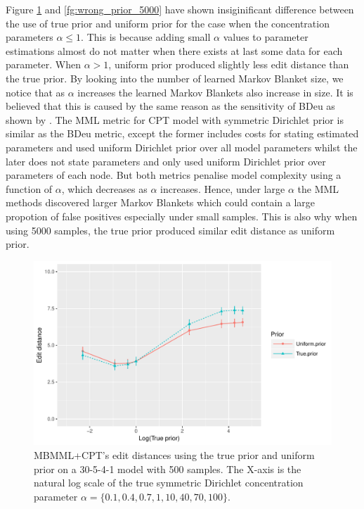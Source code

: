 \documentclass{svmult}
\begin{document}
Figure \ref{fg:wrong_prior_500} and \ref{fg:wrong_prior_5000} have shown insiginificant difference between the use of true prior and uniform prior for the case when the concentration parameters $\alpha \le 1$. This is because adding small $\alpha$ values to parameter estimations almost do not matter when there exists at last some data for each parameter. When $\alpha > 1$, uniform prior produced slightly less edit distance than the true prior. By looking into the number of learned Markov Blanket size, we notice that as $\alpha$ increases the learned Markov Blankets also increase in size. It is believed that this is caused by the same reason as the sensitivity of BDeu as shown by \cite{silander2007sensitivity}. The MML metric for CPT model with symmetric Dirichlet prior is similar as the BDeu metric, except the former includes costs for stating estimated parameters and used uniform Dirichlet prior over all model parameters whilst the later does not state parameters and only used uniform Dirichlet prior over parameters of each node. But both metrics penalise model complexity using a function of $\alpha$, which decreases as $\alpha$ increases. Hence, under large $\alpha$ the MML methods discovered larger Markov Blankets which could contain a large propotion of false positives especially under small samples. This is also why when using 5000 samples, the true prior produced similar edit distance as uniform prior.

\begin{figure}[hbt]
  \centering
    \includegraphics[scale=0.6]{figures/ed_vs_trueprior_30_5_4_alpha_134445_500.pdf}
  \caption{MBMML+CPT's edit distances using the true prior and uniform prior on a 30-5-4-1 model with 500 samples. The X-axis is the natural log scale of the true symmetric Dirichlet concentration parameter $\alpha = \{0.1, 0.4, 0.7, 1, 10, 40, 70, 100\}$.}
  \label{fg:wrong_prior_500}
\end{figure}
\end{document}
